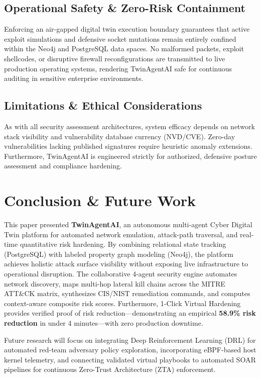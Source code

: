 \documentclass[conference]{IEEEtran}
\begin{document}
\subsection{Operational Safety \& Zero-Risk Containment}
Enforcing an air-gapped digital twin execution boundary guarantees that active exploit simulations and defensive socket mutations remain entirely confined within the Neo4j and PostgreSQL data spaces. No malformed packets, exploit shellcodes, or disruptive firewall reconfigurations are transmitted to live production operating systems, rendering TwinAgentAI safe for continuous auditing in sensitive enterprise environments.

\subsection{Limitations \& Ethical Considerations}
As with all security assessment architectures, system efficacy depends on network stack visibility and vulnerability database currency (NVD/CVE). Zero-day vulnerabilities lacking published signatures require heuristic anomaly extensions. Furthermore, TwinAgentAI is engineered strictly for authorized, defensive posture assessment and compliance hardening.

\section{Conclusion \& Future Work}
This paper presented \textbf{TwinAgentAI}, an autonomous multi-agent Cyber Digital Twin platform for automated network emulation, attack-path traversal, and real-time quantitative risk hardening. By combining relational state tracking (PostgreSQL) with labeled property graph modeling (Neo4j), the platform achieves holistic attack surface visibility without exposing live infrastructure to operational disruption. The collaborative 4-agent security engine automates network discovery, maps multi-hop lateral kill chains across the MITRE ATT\&CK matrix, synthesizes CIS/NIST remediation commands, and computes context-aware composite risk scores. Furthermore, 1-Click Virtual Hardening provides verified proof of risk reduction---demonstrating an empirical \textbf{58.9\% risk reduction} in under 4 minutes---with zero production downtime.

Future research will focus on integrating Deep Reinforcement Learning (DRL) for automated red-team adversary policy exploration, incorporating eBPF-based host kernel telemetry, and connecting validated virtual playbooks to automated SOAR pipelines for continuous Zero-Trust Architecture (ZTA) enforcement.
\end{document}
